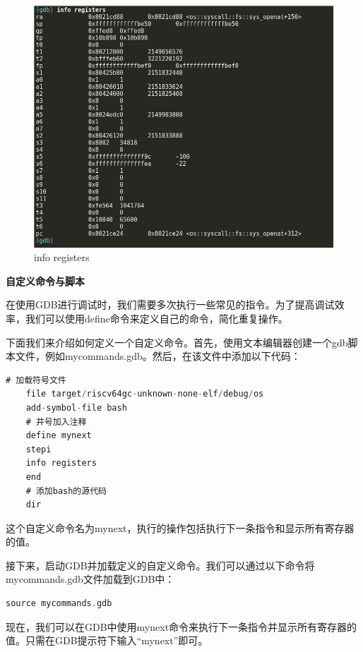 \begin{figure}[htb]
\centering
\includegraphics[width=\textwidth]{figures/02-02-info registers.png}
\caption{
	info registers
}
\label{fig:info registers}
\end{figure}

\textbf{自定义命令与脚本}

在使用GDB进行调试时，我们需要多次执行一些常见的指令。为了提高调试效率，我们可以使用define命令来定义自己的命令，简化重复操作。

下面我们来介绍如何定义一个自定义命令。首先，使用文本编辑器创建一个gdb脚本文件，例如mycommands.gdb。然后，在该文件中添加以下代码：

\begin{lstlisting}[language={Rust}, label={code:forktest},
	caption={forktest1.rs}]
	# 加载符号文件
	file target/riscv64gc-unknown-none-elf/debug/os
	add-symbol-file bash
	# 井号加入注释
	define mynext
	stepi
	info registers
	end
	# 添加bash的源代码
	dir 
\end{lstlisting}

这个自定义命令名为mynext，执行的操作包括执行下一条指令和显示所有寄存器的值。

接下来，启动GDB并加载定义的自定义命令。我们可以通过以下命令将mycommands.gdb文件加载到GDB中：

\begin{lstlisting}[language={Rust}, label={code:forktest},
	caption={forktest1.rs}]
	source mycommands.gdb
\end{lstlisting}

现在，我们可以在GDB中使用mynext命令来执行下一条指令并显示所有寄存器的值。只需在GDB提示符下输入“mynext”即可。

